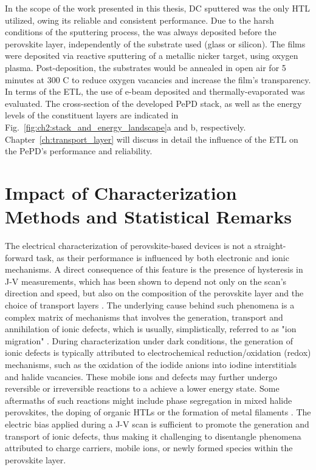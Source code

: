 In the scope of the work presented in this thesis, DC sputtered  was the only HTL utilized, owing its reliable and consistent performance. Due to the harsh conditions of the sputtering process, the  was always deposited before the perovskite layer, independently of the substrate used (glass or silicon). The films were deposited via reactive sputtering of a metallic nicker target, using oxygen plasma. Post-deposition, the substrates would be annealed in open air for 5 minutes at 300 \degree
C to reduce oxygen vacancies and increase the film's transparency. In terms of the ETL, the use of e-beam deposited  and thermally-evaporated  was evaluated. The cross-section of the developed PePD stack, as well as the energy levels of the constituent layers are indicated in Fig.~\ref{fig:ch2:stack_and_energy_landscape}a and b, respectively. Chapter~\ref{ch:transport_layer} will discuss in detail the influence of the ETL on the PePD's performance and reliability. 


\section{Impact of Characterization Methods and Statistical Remarks}



The electrical characterization of perovskite-based devices is not a straight-forward task, as their performance is influenced by both electronic and ionic mechanisms. A direct consequence of this feature is the presence of hysteresis in J-V measurements, which has been shown to depend not only on the scan's direction and speed, but also on the composition of the perovskite layer and the choice of transport layers \cite{Snaith2014AnomalousCells,Dualeh2014ImpedanceCells}.
The underlying cause behind such phenomena is a complex matrix of mechanisms that involves the generation, transport and annihilation of ionic defects, which is usually, simplistically, referred to as "ion migration" \cite{Xu2024BeyondPerspective}. During characterization under dark conditions, the generation of ionic defects is typically attributed to electrochemical reduction/oxidation (redox) mechanisms, such as the oxidation of the iodide anions into iodine interstitials and halide vacancies. These mobile ions and defects may further undergo reversible or irreversible reactions to a achieve a lower energy state. Some aftermaths of such  reactions might include phase segregation in mixed halide perovskites, the doping of organic HTLs or the formation of metal filaments \cite{Kerner2021OrganicDevices, Hoke2014ReversiblePhotovoltaics,Xu2023Reverse-biasCells}. The electric bias applied during a J-V scan is sufficient to promote the generation and transport of ionic defects, thus making it challenging to disentangle phenomena attributed to charge carriers, mobile ions, or newly formed species within the perovskite layer. 

